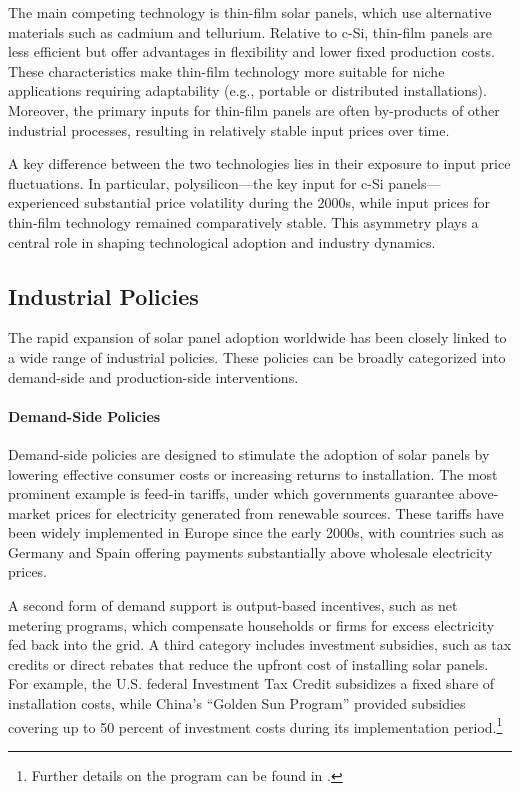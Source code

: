 \documentclass[12pt]{article}
\begin{document}
The main competing technology is thin-film solar panels, which use alternative materials such as cadmium and tellurium. Relative to c-Si, thin-film panels are less efficient but offer advantages in flexibility and lower fixed production costs. These characteristics make thin-film technology more suitable for niche applications requiring adaptability (e.g., portable or distributed installations). Moreover, the primary inputs for thin-film panels are often by-products of other industrial processes, resulting in relatively stable input prices over time.

A key difference between the two technologies lies in their exposure to input price fluctuations. In particular, polysilicon—the key input for c-Si panels—experienced substantial price volatility during the 2000s, while input prices for thin-film technology remained comparatively stable. This asymmetry plays a central role in shaping technological adoption and industry dynamics.






\subsection{Industrial Policies}
\label{subsec:ind_policy}
The rapid expansion of solar panel adoption worldwide has been closely linked to a wide range of industrial policies. These policies can be broadly categorized into demand-side and production-side interventions.

\paragraph{Demand-Side Policies}

Demand-side policies are designed to stimulate the adoption of solar panels by lowering effective consumer costs or increasing returns to installation. The most prominent example is feed-in tariffs, under which governments guarantee above-market prices for electricity generated from renewable sources. These tariffs have been widely implemented in Europe since the early 2000s, with countries such as Germany and Spain offering payments substantially above wholesale electricity prices.

A second form of demand support is output-based incentives, such as net metering programs, which compensate households or firms for excess electricity fed back into the grid. A third category includes investment subsidies, such as tax credits or direct rebates that reduce the upfront cost of installing solar panels. For example, the U.S. federal Investment Tax Credit subsidizes a fixed share of installation costs, while China’s “Golden Sun Program” provided subsidies covering up to 50 percent of investment costs during its implementation period.\footnote{Further details on the program can be found in \cite{iea_golden_sun_2021}.}
\end{document}
